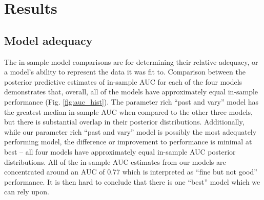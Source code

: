 \documentclass[12pt,letterpaper]{article}
\begin{document}
\section{Results}

\subsection{Model adequacy}

The in-sample model comparisons are for determining their relative adequacy, or a model's ability to represent the data it was fit to. Comparison between the posterior predictive estimates of in-sample AUC for each of the four models demonstrates that, overall, all of the models have approximately equal in-sample performance (Fig. \ref{fig:auc_hist}). The parameter rich ``past and vary'' model has the greatest median in-sample AUC when compared to the other three models, but there is substantial overlap in their posterior distributions. Additionally, while our parameter rich ``past and vary'' model is possibly the most adequately performing model, the difference or improvement to performance is minimal at best -- all four models have approximately equal in-sample AUC posterior distributions. All of the in-sample AUC estimates from our models are concentrated around an AUC of 0.77 which is interpreted as ``fine but not good'' performance. It is then hard to conclude that there is one ``best'' model which we can rely upon. 
\end{document}
